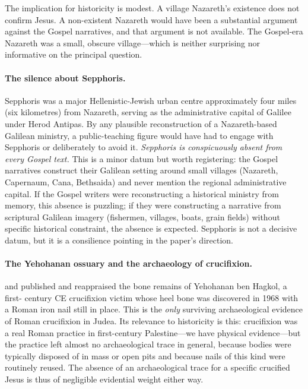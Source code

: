 \documentclass[12pt,oneside]{article}
\begin{document}
The implication for historicity is modest.  A village Nazareth's
existence does not confirm Jesus.  A non-existent Nazareth would
have been a substantial argument against the Gospel narratives, and
that argument is not available.  The Gospel-era Nazareth was a
small, obscure village---which is neither surprising nor
informative on the principal question.

\paragraph{The silence about Sepphoris.}
Sepphoris was a major Hellenistic-Jewish urban centre approximately
four miles (six kilometres) from Nazareth, serving as the
administrative capital of Galilee under Herod Antipas.  By any
plausible reconstruction of a Nazareth-based Galilean ministry, a
public-teaching figure would have had to engage with Sepphoris or
deliberately to avoid it.  \textit{Sepphoris is conspicuously absent
from every Gospel text.}  This is a minor datum but worth
registering: the Gospel narratives construct their Galilean setting
around small villages (Nazareth, Capernaum, Cana, Bethsaida) and
never mention the regional administrative capital.  If the Gospel
writers were reconstructing a historical ministry from memory, this
absence is puzzling; if they were constructing a narrative from
scriptural Galilean imagery (fishermen, villages, boats, grain
fields) without specific historical constraint, the absence is
expected.  Sepphoris is not a decisive datum, but it is a
consilience pointing in the paper's direction.

\paragraph{The {Yehohanan} ossuary and the archaeology of
crucifixion.}
\citet{TzaferisYehohanan1970} and \citet{ZiasSekeles1985} published
and reappraised the bone remains of Yehohanan ben Hagkol, a first-
century CE crucifixion victim whose heel bone was discovered in
1968 with a Roman iron nail still in place.  This is the \textit{only}
surviving archaeological evidence of Roman crucifixion in Judea.
Its relevance to historicity is this: crucifixion was a real
Roman practice in first-century Palestine---we have physical
evidence---but the practice left almost no archaeological trace in
general, because bodies were typically disposed of in mass or open
pits and because nails of this kind were routinely reused.  The
absence of an archaeological trace for a specific crucified Jesus
is thus of negligible evidential weight either way.
\end{document}
